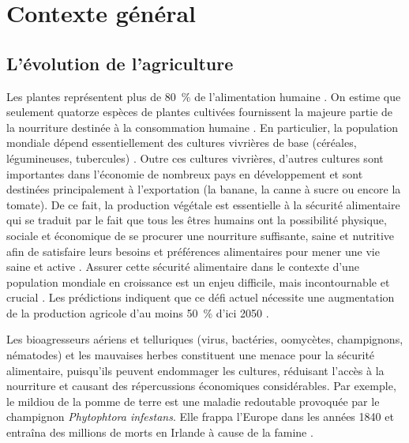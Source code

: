 \newcommand{\corriger}[1]{\textcolor{red}{#1}}
\chapter{Contexte général} \label{intro} \label{chapitre_1}
\minitoc
	
\clearpage

\section{L'évolution de l'agriculture}

 Les plantes représentent plus de 80~\% de l'alimentation humaine \citep{FAO2017}. 
On estime que seulement quatorze espèces de  plantes cultivées fournissent la majeure partie de la nourriture destinée à la consommation humaine \citep{Strange2005}.
 En particulier, la population mondiale dépend essentiellement des cultures vivrières de base (céréales, légumineuses,  tubercules) \citep{FAO2017}. Outre ces cultures vivrières, d'autres cultures sont importantes dans l'économie de nombreux pays en développement et sont destinées principalement à l'exportation (la banane, la canne à sucre ou encore la tomate).
De ce fait, la production végétale est essentielle à la sécurité alimentaire qui se traduit par le fait que \og tous les êtres humains ont  la possibilité physique, sociale et économique de se procurer une nourriture suffisante, saine et nutritive afin  de satisfaire leurs besoins et préférences alimentaires pour mener une vie saine et active \fg{} \citep{FAO2017}. Assurer cette sécurité alimentaire dans le contexte d'une population mondiale en croissance  est un enjeu difficile, mais incontournable et crucial \citep{Tilman2011}. Les prédictions indiquent que ce défi actuel  nécessite une augmentation de la production agricole d'au moins 50~\% d'ici 2050 \citep{Tilman2011}. 
	
	Les bioagresseurs  aériens et telluriques  (virus, bactéries, oomycètes, champignons, nématodes) et les mauvaises herbes constituent une menace pour la sécurité alimentaire, puisqu'ils peuvent endommager les cultures, réduisant l'accès à la nourriture et causant des répercussions économiques considérables. 
	Par exemple, le mildiou de la pomme de terre est une maladie redoutable provoquée par le champignon \textit{Phytophtora infestans}. Elle frappa l'Europe dans les années 1840 et entraîna  des millions de morts en Irlande à cause de la famine \citep{Large1940, Spielman1991}. 

